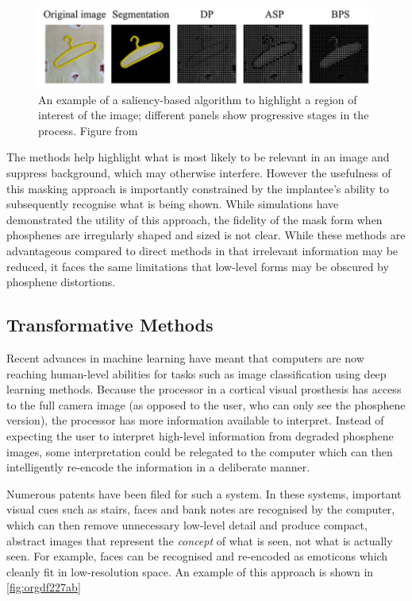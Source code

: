 \documentclass[a4paper,11pt,openany]{book}
\begin{document}
\begin{figure}[htbp]
\centering
\includegraphics[width=.9\linewidth]{./graphics/litreview/saliency.png}
\caption[Example of using a saliency-based algorithm to highlight a region of interest]{\label{fig:orga31b62c}
An example of a saliency-based algorithm to highlight a region of interest of the image; different panels show progressive stages in the process. Figure from \cite{li_image_2018}}
\end{figure}

The methods help highlight what is most likely to be relevant in an image and suppress background, which may otherwise interfere.
However the usefulness of this masking approach is importantly constrained by the implantee's ability to subsequently recognise what is being shown.
While simulations have demonstrated the utility of this approach, the fidelity of the mask form when phosphenes are irregularly shaped and sized is not clear.
While these methods are advantageous compared to direct methods in that irrelevant information may be reduced, it faces the same limitations that low-level forms may be obscured by phosphene distortions.

\subsection*{Transformative Methods}
\label{sec:org815b61a}

Recent advances in machine learning have meant that computers are now reaching human-level abilities for tasks such as image classification using deep learning methods. \cite{rawat_deep_2017,guo_deep_2016}
Because the processor in a cortical visual prosthesis has access to the full camera image (as opposed to the user, who can only see the phosphene version), the processor has more information available to interpret.
Instead of expecting the user to interpret high-level information from degraded phosphene images, some interpretation could be relegated to the computer which can then intelligently re-encode the information in a deliberate manner.

Numerous patents have been filed for such a system. \cite{chichilnisky_eduardo-jose_smart_2018,li_going_2013}
In these systems, important visual cues such as stairs, faces and bank notes are recognised by the computer, which can then remove unnecessary low-level detail and produce compact, abstract images that represent the \emph{concept} of what is seen, not what is actually seen.
For example, faces can be recognised and re-encoded as emoticons which cleanly fit in low-resolution space. \cite{lui_transformative_2012}
An example of this approach is shown in \ref{fig:orgdf227ab}
\end{document}
